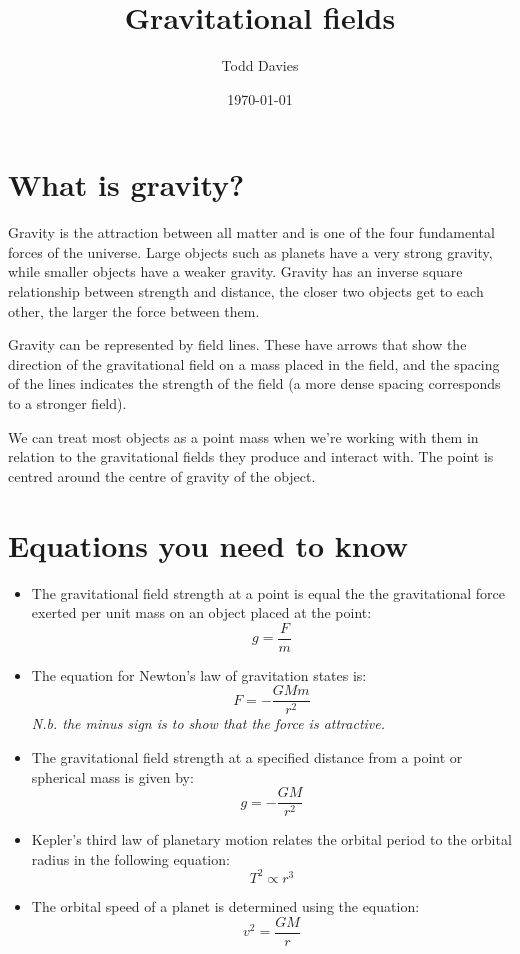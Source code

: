 \documentclass{article}
\title{Gravitational fields}
\author{Todd Davies}
\date{\today}
\begin{document}
\lhead{\today}
\setlength{\parindent}{0cm}

\maketitle

\section*{What is gravity?}
\thispagestyle{empty}
Gravity is the attraction between all matter and is one of the four fundamental forces of the universe. Large objects such as planets have a very strong gravity, while smaller objects have a weaker gravity. Gravity has an inverse square relationship between strength and distance, the closer two objects get to each other, the larger the force between them.

Gravity can be represented by field lines. These have arrows that show the direction of the gravitational field on a mass placed in the field, and the spacing of the lines indicates the strength of the field (a more dense spacing corresponds to a stronger field).

We can treat most objects as a point mass when we're working with them in relation to the gravitational fields they produce and interact with. The point is centred around the centre of gravity of the object.


\section*{Equations you need to know}

\begin{itemize}
	\item The gravitational field strength at a point is equal the the gravitational force exerted per unit mass on an object placed at the point:
	\[
		g = \frac{F}{m}
	\]
	\item The equation for Newton's law of gravitation states is:
	\[
		F = -\frac{GMm}{r^2}
	\]
	\textit{N.b. the minus sign is to show that the force is attractive.}
	\item The gravitational field strength at a specified distance from a point or spherical mass is given by:
	\[
		g = -\frac{GM}{r^2}
	\]
	\item Kepler's third law of planetary motion relates the orbital period to the orbital radius in the following equation:
	\[
		T^2 \propto r^3
	\]
	\item The orbital speed of a planet is determined using the equation:
	\[
		v^2 = \frac{GM}{r}
	\]
\end{itemize}
\end{document}
